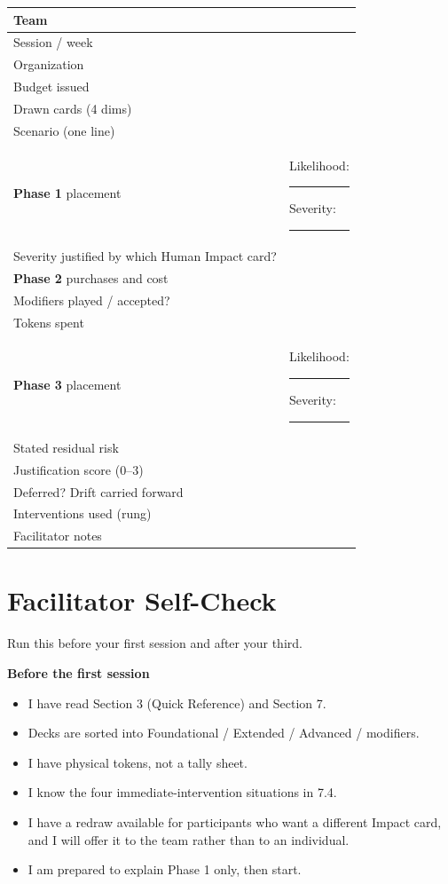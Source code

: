 \documentclass[11pt,letterpaper]{article}
\begin{document}
\vspace{0.8em}
\noindent
\begin{tabularx}{\textwidth}{@{}p{3.4cm} X@{}}
\toprule
Team & \rule{0pt}{2.2em} \\
\midrule
Session / week & \rule{0pt}{2.2em} \\
\midrule
Organization & \rule{0pt}{2.2em} \\
\midrule
Budget issued & \rule{0pt}{2.2em} \\
\midrule
Drawn cards (4 dims) & \rule{0pt}{3em} \\
\midrule
Scenario (one line) & \rule{0pt}{3em} \\
\midrule
\textbf{Phase 1} placement & Likelihood: \rule{2.5cm}{0.4pt} \quad Severity:
\rule{2.5cm}{0.4pt}\\
\midrule
Severity justified by which Human Impact card? & \rule{0pt}{2.4em} \\
\midrule
\textbf{Phase 2} purchases and cost & \rule{0pt}{5em} \\
\midrule
Modifiers played / accepted? & \rule{0pt}{3em} \\
\midrule
Tokens spent & \rule{0pt}{2.2em} \\
\midrule
\textbf{Phase 3} placement & Likelihood: \rule{2.5cm}{0.4pt} \quad Severity:
\rule{2.5cm}{0.4pt}\\
\midrule
Stated residual risk & \rule{0pt}{3em} \\
\midrule
Justification score (0--3) & \rule{0pt}{2.2em} \\
\midrule
Deferred? Drift carried forward & \rule{0pt}{2.4em} \\
\midrule
Interventions used (rung) & \rule{0pt}{2.4em} \\
\midrule
Facilitator notes & \rule{0pt}{5em} \\
\bottomrule
\end{tabularx}

\newpage


\newpage
\section{Facilitator Self-Check}

Run this before your first session and after your third.

\vspace{0.6em}
\noindent\textbf{Before the first session}
\begin{itemize}
\item[$\square$] I have read Section 3 (Quick Reference) and Section 7.
\item[$\square$] Decks are sorted into Foundational / Extended / Advanced /
modifiers.
\item[$\square$] I have physical tokens, not a tally sheet.
\item[$\square$] I know the four immediate-intervention situations in 7.4.
\item[$\square$] I have a redraw available for participants who want a different
Impact card, and I will offer it to the team rather than to an individual.
\item[$\square$] I am prepared to explain Phase 1 only, then start.
\end{itemize}
\end{document}
